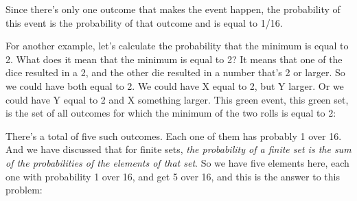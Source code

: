 \documentclass[pdftex, brazil, 12pt, twoside]{article}
\begin{document}
Since there's only one outcome that makes the event happen,
the probability of this event is the probability of that
outcome and is equal to 1/16.

\begin{figure}[H]
  \begin{center}
  \end{center}
\end{figure}

For another example, let's calculate the probability that
the minimum is equal to 2.
What does it mean that the minimum is equal to 2?
It means that one of the dice resulted in a 2, and the other
die resulted in a number that's 2 or larger.
So we could have both equal to 2.
We could have X equal to 2, but Y larger.
Or we could have Y equal to 2 and X something larger.
This green event, this green set, is the set of all
outcomes for which the minimum of the two
rolls is equal to 2:

\begin{figure}[H]
  \begin{center}
  \end{center}
\end{figure}

There's a total of five such outcomes.
Each one of them has probably 1 over 16.
And we have discussed that for finite sets, \emph{the probability
of a finite set is the sum of the probabilities of the
elements of that set}.
So we have five elements here, each one with
probability 1 over 16, and get 5 over 16, and this is the answer to this problem:
\end{document}
